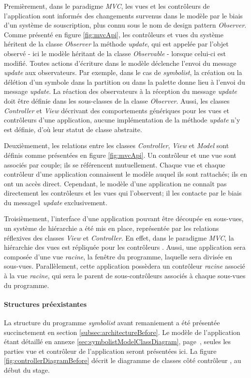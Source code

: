 Premièrement, dans le paradigme \textit{MVC}, les vues et les contrôleurs de l'application sont informés des changements survenus dans le modèle par le biais d'un système de souscription, plus connu sous le nom de design pattern \textit{Observer}. Comme présenté en figure \ref{fig:mvcApi}, les contrôleurs et vues du système héritent de la classe \textit{Observer} la méthode \textit{update}, qui est appelée par l'objet observé - ici le modèle héritant de la classe \textit{Observable} - lorsque celui-ci est modifié.
Toutes actions d'écriture dans le modèle déclenche l'envoi du message \textit{update} aux observateurs. Par exemple, dans le cas de \textit{symbolist}, la création ou la délétion d'un symbole dans la partition ou dans la palette donne lieu à l'envoi du message \textit{update}.
La réaction des observateurs à la réception du message \textit{update} doit être définie dans les sous-classes de la classe \textit{Observer}. Aussi, les classes \textit{Controller} et \textit{View} décrivant des comportements génériques pour les vues et contrôleurs d'une application, aucune implémentation de la méthode \textit{update} n'y est définie, d'où leur statut de classe abstraite.

Deuxièmement, les relations entre les classes \textit{Controller}, \textit{View} et \textit{Model} sont définis comme présentées en figure \ref{fig:mvcApi}. Un contrôleur et une vue sont associés par couple; ils se référencent mutuellement. Chaque vue et chaque contrôleur d'une application connaissent le modèle auquel ils sont rattachés; ils en ont un accès direct. Cependant, le modèle d'une application ne connaît pas directement les contrôleurs et les vues qui l'observent; il les contacte par le biais du message1 \textit{update} exclusivement.

Troisièmement, l'interface d'une application pouvant être découpée en sous-vues, un système de hiérarchie a été mis en place, représentée par les relations réflexives des classes \textit{View} et \textit{Controller}. En effet, dans le paradigme \textit{MVC}, la hiérarchie des vues est répliquée pour les contrôleurs \cite{krasner1988}. Aussi, une application sera composée d'une vue \textit{racine}, la fenêtre du programme, laquelle sera divisée en sous-vues. Parallèlement, cette application possèdera un contrôleur \textit{racine} associé à la vue \textit{racine}, qui sera le parent de sous-contrôleurs associés à chaque sous-vues du programme.

\paragraph{Structures préexistantes} La structure du programme \textit{symbolist} avant remaniement a été présentée succinctement en section \ref{subsec:architectureBefore}. Le modèle de l'application étant détaillé en annexe \ref{sec:symbolistModelClassDiagram}, page~\pageref{sec:symbolistModelClassDiagram}, seules les parties vue et contrôleur de l'application seront présentées ici.
La figure \ref{fig:controllerDiagramBefore} décrit le diagramme de classes \og côté contrôleur \fg, au début du stage.

